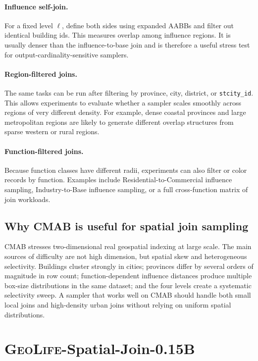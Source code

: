 \documentclass[11pt]{article}
\newcommand{\code}[1]{\ifmmode\text{\ttfamily #1}\else\texttt{#1}\fi}
\newcommand{\cmab}{\textsc{CMAB}}
\newcommand{\geolife}{\textsc{GeoLife}}
\begin{document}
\paragraph{Influence self-join.}
For a fixed level $\ell$, define both sides using expanded AABBs and filter out identical building ids.  This measures overlap among influence regions.  It is usually denser than the influence-to-base join and is therefore a useful stress test for output-cardinality-sensitive samplers.

\paragraph{Region-filtered joins.}
The same tasks can be run after filtering by province, city, district, or \code{stcity\_id}.  This allows experiments to evaluate whether a sampler scales smoothly across regions of very different density.  For example, dense coastal provinces and large metropolitan regions are likely to generate different overlap structures from sparse western or rural regions.

\paragraph{Function-filtered joins.}
Because function classes have different radii, experiments can also filter or color records by function.  Examples include Residential-to-Commercial influence sampling, Industry-to-Base influence sampling, or a full cross-function matrix of join workloads.

\subsection{Why \cmab{} is useful for spatial join sampling}

\cmab{} stresses two-dimensional real geospatial indexing at large scale.  The main sources of difficulty are not high dimension, but spatial skew and heterogeneous selectivity.  Buildings cluster strongly in cities; provinces differ by several orders of magnitude in row count; function-dependent influence distances produce multiple box-size distributions in the same dataset; and the four levels create a systematic selectivity sweep.  A sampler that works well on \cmab{} should handle both small local joins and high-density urban joins without relying on uniform spatial distributions.

\section{\geolife-Spatial-Join-0.15B}
\label{sec:geolife}
\end{document}
